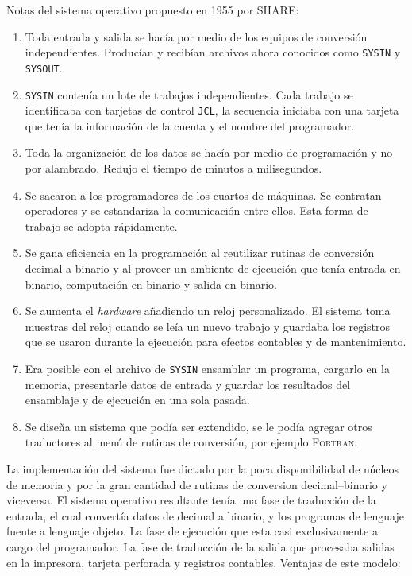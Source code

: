Notas del sistema operativo propuesto en 1955 por \textsc{SHARE}:
\begin{enumerate}
    \item Toda entrada y salida se hacía por medio de los equipos de conversión independientes. Producían y recibían archivos ahora conocidos como \texttt{SYSIN} y \texttt{SYSOUT}.
    \item \texttt{SYSIN} contenía un lote de trabajos independientes. Cada trabajo se identificaba con tarjetas de control \texttt{JCL}, la secuencia iniciaba con una tarjeta que tenía la información de la cuenta y el nombre del programador.
    \item Toda la organización de los datos se hacía por medio de programación y no por alambrado. Redujo el tiempo de minutos a milisegundos.
    \item Se sacaron a los programadores de los cuartos de máquinas. Se contratan operadores y se estandariza la comunicación entre ellos. Esta forma de trabajo se adopta rápidamente.
    \item Se gana eficiencia en la programación al reutilizar rutinas de conversión decimal a binario y al proveer un ambiente de ejecución que tenía entrada en binario, computación en binario y salida en binario.
    \item Se aumenta el \textit{hardware} añadiendo un reloj personalizado. El sistema toma muestras del reloj cuando se leía un nuevo trabajo y guardaba los registros que se usaron durante la ejecución para efectos contables y de mantenimiento.
    \item Era posible con el archivo de \texttt{SYSIN} ensamblar un programa, cargarlo en la memoria, presentarle datos de entrada y guardar los resultados del ensamblaje y de ejecución en una sola pasada.
    \item Se diseña un sistema que podía ser extendido, se le podía agregar otros traductores al menú de rutinas de conversión, por ejemplo \textsc{Fortran}.
    
\end{enumerate}

\label{sec:impl}
La implementación del sistema fue dictado por la poca disponibilidad de núcleos de memoria y por la gran cantidad de rutinas de conversion decimal--binario y viceversa. El sistema operativo resultante tenía una fase de traducción de la entrada, el cual convertía datos de decimal a binario, y los programas de lenguaje fuente a lenguaje objeto. La fase de ejecución que esta casi exclusivamente a cargo del programador. La fase de traducción de la salida que procesaba salidas en la impresora, tarjeta perforada y registros contables. Ventajas de este modelo:


